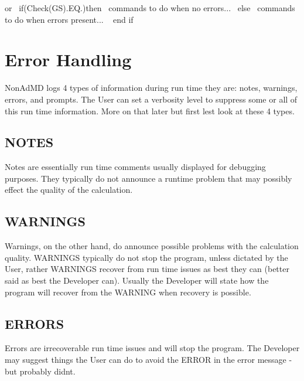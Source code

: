  or~\newline
 if(Check(\+G\+S).E\+Q.)then~\newline
  commands to do when no errors...~\newline
 else~\newline
  commands to do when errors present... ~\newline
 end if~\newline
~\newline
\hypertarget{_interface_Error_Handling}{}\section{Error Handling}\label{_interface_Error_Handling}
Non\+Ad\+MD logs 4 types of information during run time they are\+: notes, warnings, errors, and prompts. The User can set a verbosity level to suppress some or all of this run time information. More on that later but first lest look at these 4 types.~\newline
\hypertarget{_interface_NOTES}{}\subsection{N\+O\+T\+ES}\label{_interface_NOTES}
Notes are essentially run time comments usually displayed for debugging purposes. They typically do not announce a runtime problem that may possibly effect the quality of the calculation.~\newline
\hypertarget{_interface_WARNINGS}{}\subsection{W\+A\+R\+N\+I\+N\+GS}\label{_interface_WARNINGS}
Warnings, on the other hand, do announce possible problems with the calculation quality. W\+A\+R\+N\+I\+N\+GS typically do not stop the program, unless dictated by the User, rather W\+A\+R\+N\+I\+N\+GS recover from run time issues as best they can (better said as best the Developer can). Usually the Developer will state how the program will recover from the W\+A\+R\+N\+I\+NG when recovery is possible.~\newline
\hypertarget{_interface_ERRORS}{}\subsection{E\+R\+R\+O\+RS}\label{_interface_ERRORS}
Errors are irrecoverable run time issues and will stop the program. The Developer may suggest things the User can do to avoid the E\+R\+R\+OR in the error message -\/ but probably didn\textquotesingle{}t.~\newline
